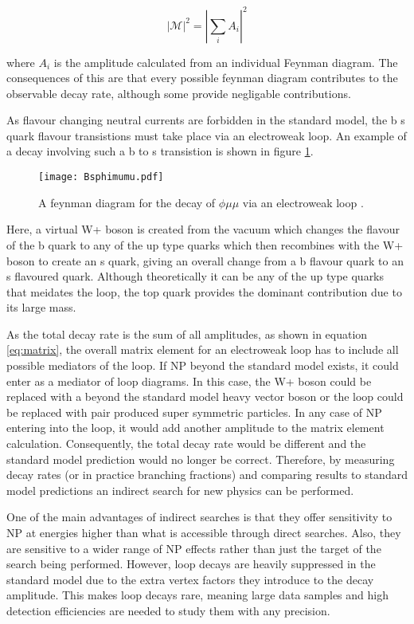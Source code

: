 \begin{equation}
  \label{eq:matrix}
  |\mathscr{M}|^2=|\sum_i A_i|^2
\end{equation}

where $A_i$ is the amplitude calculated from an individual Feynman diagram.  The consequences of this are that every possible feynman diagram contributes to the observable decay rate, although some provide negligable contributions.

As flavour changing neutral currents are forbidden in the standard model, the b \to s quark flavour transistions must take place via an electroweak loop.  An example of a decay involving such a b to s transistion is shown in figure \ref{fig:btos}.

\begin{figure}
  \centering
  \texttt{[image: Bsphimumu.pdf]}
  \caption{A feynman diagram for the decay of \Bs \to $\phi \mu \mu$ via an electroweak loop \cite{LHCb-PAPER-2013-017}.}
  \label{fig:btos}
\end{figure}

Here, a virtual W+ boson is created from the vacuum which changes the flavour of the b quark to any of the up type quarks which then recombines with the W+ boson to create an s quark, giving an overall change from a b flavour quark to an s flavoured quark.  Although theoretically it can be any of the up type quarks that meidates the loop, the top quark provides the dominant contribution due to its large mass.

As the total decay rate is the sum of all amplitudes, as shown in equation \ref{eq:matrix}, the overall matrix element for an electroweak loop has to include all possible mediators of the loop.  If NP beyond the standard model exists, it could enter as a mediator of loop diagrams.  In this case, the W+ boson could be replaced with a beyond the standard model heavy vector boson or the loop could be replaced with pair produced super symmetric particles.  In any case of NP entering into the loop, it would add another amplitude to the matrix element calculation.  Consequently, the total decay rate would be different and the standard model prediction would no longer be correct.  Therefore, by measuring decay rates (or in practice branching fractions) and comparing results to standard model predictions an indirect search for new physics can be performed.

One of the main advantages of indirect searches is that they offer sensitivity to NP at energies higher than what is accessible through direct searches.  Also, they are sensitive to a wider range of NP effects rather than just the target of the search being performed.  However, loop decays are heavily suppressed in the standard model due to the extra vertex factors they introduce to the decay amplitude.  This makes loop decays rare, meaning large data samples and high detection efficiencies are needed to study them with any precision.








